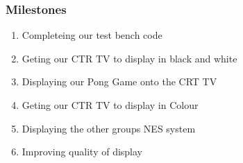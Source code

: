 \subsubsection*{Milestones}
\begin{enumerate}
	\item Completeing our test bench code
	\item Geting our CTR TV to display in black and white
	\item Displaying our Pong Game onto the CRT TV
	\item Geting our CTR TV to display in Colour
	\item Displaying the other groups NES system  
	\item Improving quality of display
\end{enumerate}
	
